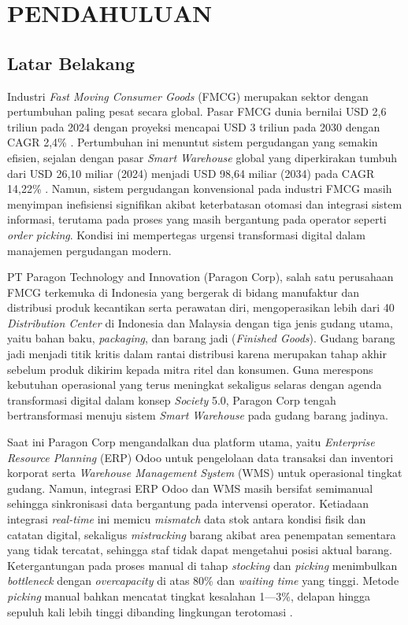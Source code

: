 \cleardoublepage %
\chapter{PENDAHULUAN}
\label{chap:pendahuluan}

\section{Latar Belakang}
Industri \textit{Fast Moving Consumer Goods} (FMCG) merupakan sektor dengan pertumbuhan paling pesat secara global. Pasar FMCG dunia bernilai USD 2,6 triliun pada 2024 dengan proyeksi mencapai USD 3 triliun pada 2030 dengan CAGR 2,4\% \autocite{researchandmarkets2025}. Pertumbuhan ini menuntut sistem pergudangan yang semakin efisien, sejalan dengan pasar \textit{Smart Warehouse} global yang diperkirakan tumbuh dari USD 26,10 miliar (2024) menjadi USD 98,64 miliar (2034) pada CAGR 14,22\% \autocite{precedenceresearch2025}. Namun, sistem pergudangan konvensional pada industri FMCG masih menyimpan inefisiensi signifikan akibat keterbatasan otomasi dan integrasi sistem informasi, terutama pada proses yang masih bergantung pada operator seperti \textit{order picking}. Kondisi ini mempertegas urgensi transformasi digital dalam manajemen pergudangan modern.

PT Paragon Technology and Innovation (Paragon Corp), salah satu perusahaan FMCG terkemuka di Indonesia yang bergerak di bidang manufaktur dan distribusi produk kecantikan serta perawatan diri, mengoperasikan lebih dari 40 \textit{Distribution Center} di Indonesia dan Malaysia dengan tiga jenis gudang utama, yaitu bahan baku, \textit{packaging}, dan barang jadi (\textit{Finished Goods}). Gudang barang jadi menjadi titik kritis dalam rantai distribusi karena merupakan tahap akhir sebelum produk dikirim kepada mitra ritel dan konsumen. Guna merespons kebutuhan operasional yang terus meningkat sekaligus selaras dengan agenda transformasi digital dalam konsep \textit{Society} 5.0, Paragon Corp tengah bertransformasi menuju sistem \textit{Smart Warehouse} pada gudang barang jadinya.

Saat ini Paragon Corp mengandalkan dua platform utama, yaitu \textit{Enterprise Resource Planning} (ERP) Odoo untuk pengelolaan data transaksi dan inventori korporat serta \textit{Warehouse Management System} (WMS) untuk operasional tingkat gudang. Namun, integrasi ERP Odoo dan WMS masih bersifat semimanual sehingga sinkronisasi data bergantung pada intervensi operator. Ketiadaan integrasi \textit{real-time} ini memicu \textit{mismatch} data stok antara kondisi fisik dan catatan digital, sekaligus \textit{mistracking} barang akibat area penempatan sementara yang tidak tercatat, sehingga staf tidak dapat mengetahui posisi aktual barang. Ketergantungan pada proses manual di tahap \textit{stocking} dan \textit{picking} menimbulkan \textit{bottleneck} dengan \textit{overcapacity} di atas 80\% dan \textit{waiting time} yang tinggi. Metode \textit{picking} manual bahkan mencatat tingkat kesalahan 1---3\%, delapan hingga sepuluh kali lebih tinggi dibanding lingkungan terotomasi \autocite{netsuite2024}.


